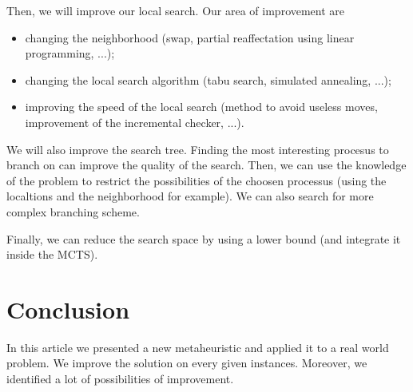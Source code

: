 \documentclass[a4paper,twocolumn]{article}
\begin{document}
Then, we will improve our local search.  Our area of improvement are
\begin{itemize}
\item changing the neighborhood (swap, partial reaffectation using
  linear programming, ...);
\item changing the local search algorithm (tabu search, simulated
  annealing, ...);
\item improving the speed of the local search (method to avoid useless
  moves, improvement of the incremental checker, ...).
\end{itemize}

We will also improve the search tree.  Finding the most interesting
procesus to branch on can improve the quality of the search.  Then, we
can use the knowledge of the problem to restrict the possibilities of
the choosen processus (using the localtions and the neighborhood for
example).  We can also search for more complex branching scheme.

Finally, we can reduce the search space by using a lower bound (and
integrate it inside the MCTS).

\section{Conclusion}

In this article we presented a new metaheuristic and applied it to a
real world problem.  We improve the solution on every given
instances.  Moreover, we identified a lot of possibilities of
improvement.



\end{document}

